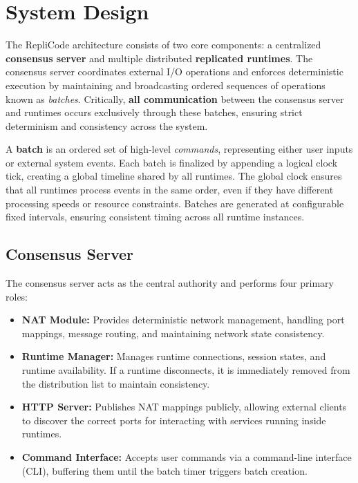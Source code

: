 \documentclass[10pt]{IEEEtran}
\begin{document}
\section{System Design}

The RepliCode architecture consists of two core components: a centralized \textbf{consensus server} and multiple distributed \textbf{replicated runtimes}. The consensus server coordinates external I/O operations and enforces deterministic execution by maintaining and broadcasting ordered sequences of operations known as \emph{batches}. Critically, \textbf{all communication} between the consensus server and runtimes occurs exclusively through these batches, ensuring strict determinism and consistency across the system.

A \textbf{batch} is an ordered set of high-level \emph{commands}, representing either user inputs or external system events. Each batch is finalized by appending a logical clock tick, creating a global timeline shared by all runtimes. The global clock ensures that all runtimes process events in the same order, even if they have different processing speeds or resource constraints. Batches are generated at configurable fixed intervals, ensuring consistent timing across all runtime instances.

\subsection{Consensus Server}

The consensus server acts as the central authority and performs four primary roles:

\begin{itemize}
\item \textbf{NAT Module:} Provides deterministic network management, handling port mappings, message routing, and maintaining network state consistency.
\item \textbf{Runtime Manager:} Manages runtime connections, session states, and runtime availability. If a runtime disconnects, it is immediately removed from the distribution list to maintain consistency.
\item \textbf{HTTP Server:} Publishes NAT mappings publicly, allowing external clients to discover the correct ports for interacting with services running inside runtimes.
\item \textbf{Command Interface:} Accepts user commands via a command-line interface (CLI), buffering them until the batch timer triggers batch creation.
\end{itemize}
\end{document}
